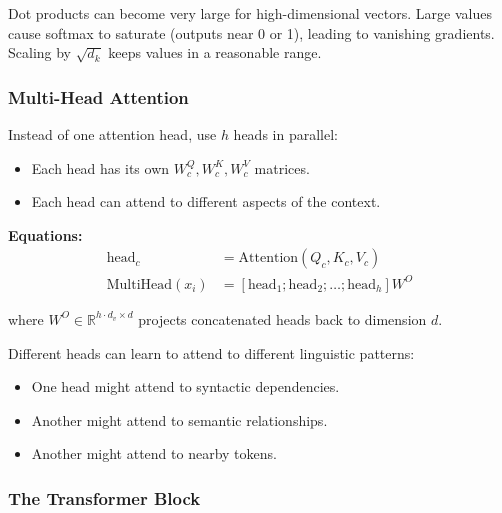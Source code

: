 \begin{tipbox}
Dot products can become very large for high-dimensional vectors. Large values cause softmax to saturate (outputs near 0 or 1), leading to vanishing gradients. Scaling by $\sqrt{d_k}$ keeps values in a reasonable range.
\end{tipbox}

\bigseparator

\subsubsection{Multi-Head Attention}

\begin{defbox}
Instead of one attention head, use $h$ heads in parallel:
\begin{itemize}
  \item Each head has its own $W^Q_c, W^K_c, W^V_c$ matrices.
  \item Each head can attend to different aspects of the context.
\end{itemize}

\textbf{Equations:}
\begin{align*}
\text{head}_c &= \text{Attention}(Q_c, K_c, V_c) \\
\text{MultiHead}(x_i) &= [\text{head}_1; \text{head}_2; \ldots; \text{head}_h] W^O
\end{align*}

where $W^O \in \mathbb{R}^{h \cdot d_v \times d}$ projects concatenated heads back to dimension $d$.
\end{defbox}

\begin{tipbox}
Different heads can learn to attend to different linguistic patterns:
\begin{itemize}
  \item One head might attend to syntactic dependencies.
  \item Another might attend to semantic relationships.
  \item Another might attend to nearby tokens.
\end{itemize}
\end{tipbox}

\bigseparator

\subsubsection{The Transformer Block}

